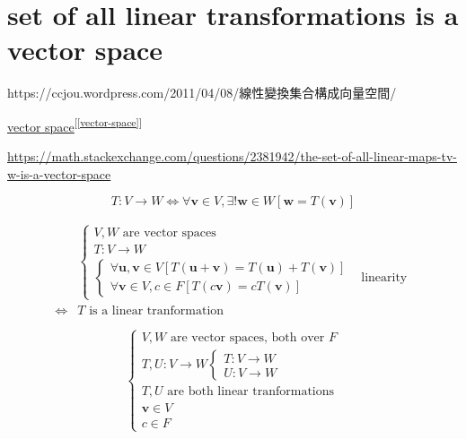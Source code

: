\documentclass[
]{book}
\theoremstyle{definition}
\theoremstyle{definition}
\theoremstyle{definition}
\theoremstyle{definition}
\theoremstyle{remark}
\begin{document}
\hypertarget{set-of-all-linear-transformations-is-a-vector-space}{%
\section{set of all linear transformations is a vector space}\label{set-of-all-linear-transformations-is-a-vector-space}}

\begin{CJK}{UTF8}{bsmi}
https://ccjou.wordpress.com/2011/04/08/線性變換集合構成向量空間/
\end{CJK}

\protect\hyperlink{vector-space}{vector space}\textsuperscript{{[}\ref{vector-space}{]}}

\url{https://math.stackexchange.com/questions/2381942/the-set-of-all-linear-maps-tv-w-is-a-vector-space}

\[
    T:V\rightarrow W
\Leftrightarrow \forall\boldsymbol{v}\in V,\exists!\boldsymbol{w}\in W\left[\boldsymbol{w}=T\left(\boldsymbol{v}\right)\right]
\]

\[
\begin{aligned}
 & \begin{cases}
V,W\text{ are vector spaces}\\
T:V\rightarrow W\\
\begin{cases}
\forall\boldsymbol{u},\boldsymbol{v}\in V\left[T\left(\boldsymbol{u}+\boldsymbol{v}\right)=T\left(\boldsymbol{u}\right)+T\left(\boldsymbol{v}\right)\right]\\
\forall\boldsymbol{v}\in V,c\in F\left[T\left(c\boldsymbol{v}\right)=cT\left(\boldsymbol{v}\right)\right]
\end{cases} & \text{linearity}
\end{cases}\\
\Leftrightarrow & T\text{ is a linear tranformation}
\end{aligned}
\]

\[
\begin{cases}
V,W\text{ are vector spaces, both over }F\\
T,U:V\rightarrow W\begin{cases}
T:V\rightarrow W\\
U:V\rightarrow W
\end{cases}\\
T,U\text{ are both linear tranformations}\\
\boldsymbol{v}\in V\\
c\in F
\end{cases}
\]
\end{document}
